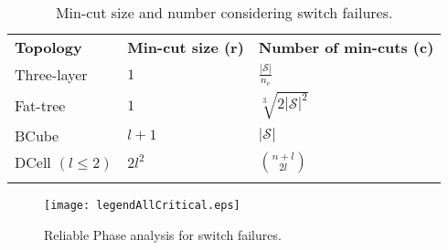 \begin{table}[hb]
\caption{Min-cut size and number considering switch failures.}
\label{tab:cuts_switch}
\begin{tabular}{lll}
\hline\noalign{\smallskip}
\textbf{Topology} &\textbf{Min-cut size (r)} &\textbf{Number of min-cuts (c)}\\
\noalign{\smallskip}\hline\noalign{\smallskip}
Three-layer &$1$ &$\frac{|\mathcal{S}|}{n_e}$ \\
Fat-tree &$1$ &$\sqrt[3]{2|\mathcal{S}|^2}$ \\
BCube &$l+1$ &$|\mathcal{S}|$ \\
DCell $(l \leq 2)$ & $2l^2$ \ &$\binom{n+l}{2l}$ \\
\noalign{\smallskip}\hline
\end{tabular}
\end{table}
\begin{figure}
\centering
{}
{\texttt{[image: legendAllCritical.eps]}}
\caption{Reliable Phase analysis for switch failures.}
\end{figure}

